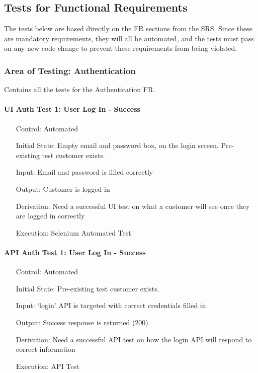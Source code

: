 \documentclass[12pt, titlepage]{article}
\begin{document}
\subsection{Tests for Functional Requirements}
The tests below are based directly on the FR sections from the SRS. Since these are mandatory requirements, they will all be automated, and the tests must pass on any new code change to prevent these requirements from being violated.

\subsubsection{Area of Testing: Authentication}
Contains all the tests for the Authentication FR.

\paragraph*{UI Auth Test 1: User Log In - Success}
\begin{itemize}
	\item[Control:] Automated
	\item[Initial State:] Empty email and password box, on the login screen. Pre-existing test customer exists. 
	\item[Input:] Email and password is filled correctly
	\item[Output:] Customer is logged in
	\item[Derivation:] Need a successful UI test on what a customer will see once they are logged in correctly
	\item[Execution:] Selenium Automated Test
\end{itemize}

\paragraph*{API Auth Test 1: User Log In - Success}
\begin{itemize}
	\item[Control:] Automated
	\item[Initial State:] Pre-existing test customer exists. 
	\item[Input:] `login' API is targeted with correct credentials filled in
	\item[Output:] Success response is returned (200)
	\item[Derivation:] Need a successful API test on how the login API will respond to correct information
	\item[Execution:] API Test
\end{itemize}
\end{document}
